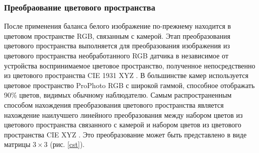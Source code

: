 \subsubsection{Преобраование цветового пространства}

После применения баланса белого изображение по-прежнему находится в цветовом пространстве RGB, связанным с камерой. Этап преобразования цветового пространства выполняется для преобразования изображения из цветового пространства необработанного RGB датчика в независимое от устройства воспринимаемое цветовое пространство, полученное непосредственно из цветового пространства CIE 1931 XYZ \cite{lib-cie}. В большинстве камер используется цветовое пространство ProPhoto RGB с широкой гаммой, способное отображать 90\% цветов, видимых обычному наблюдателю. Самым распространенным способом нахождения преобразования цветового пространства является нахождение наилучшего линейного преобразования между набором цветов из цветового пространства связанного с камерой и набором цветов из цветового пространства CIE XYZ \cite{lib-brown-cst}. Это преобразование может быть представлено в виде матрицы $3 \times 3$ (рис. \ref{cst}).

